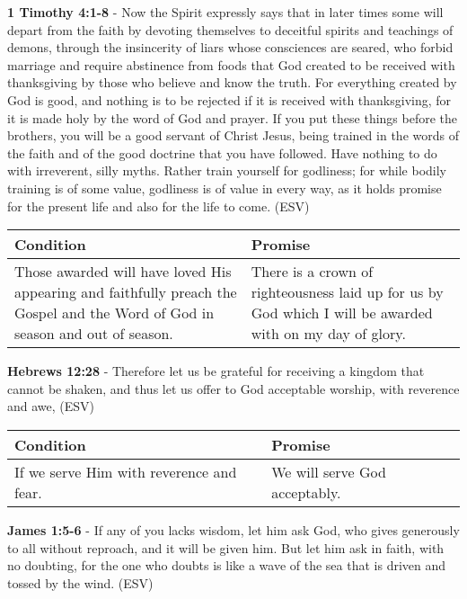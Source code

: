 \documentclass[11pt]{article}
\begin{document}
\textbf{1 Timothy 4:1-8} - Now the Spirit expressly says that in later times some will depart from the faith by devoting themselves to deceitful spirits and teachings of demons, through the insincerity of liars whose consciences are seared, who forbid marriage and require abstinence from foods that God created to be received with thanksgiving by those who believe and know the truth. For everything created by God is good, and nothing is to be rejected if it is received with thanksgiving, for it is made holy by the word of God and prayer. If you put these things before the brothers, you will be a good servant of Christ Jesus, being trained in the words of the faith and of the good doctrine that you have followed. Have nothing to do with irreverent, silly myths. Rather train yourself for godliness; for while bodily training is of some value, godliness is of value in every way, as it holds promise for the present life and also for the life to come. (ESV)

\begin{center}
\begin{tabular}{ll}
Condition & Promise\\[0pt]
\hline
Those awarded will have loved His appearing and faithfully preach the Gospel and the Word of God in season and out of season. & There is a crown of righteousness laid up for us by God which I will be awarded with on my day of glory.\\[0pt]
\end{tabular}
\end{center}

\textbf{Hebrews 12:28} - Therefore let us be grateful for receiving a kingdom that cannot be shaken, and thus let us offer to God acceptable worship, with reverence and awe, (ESV)

\begin{center}
\begin{tabular}{ll}
Condition & Promise\\[0pt]
\hline
If we serve Him with reverence and fear. & We will serve God acceptably.\\[0pt]
\end{tabular}
\end{center}

\textbf{James 1:5-6} - If any of you lacks wisdom, let him ask God, who gives generously to all without reproach, and it will be given him. But let him ask in faith, with no doubting, for the one who doubts is like a wave of the sea that is driven and tossed by the wind. (ESV)
\end{document}
